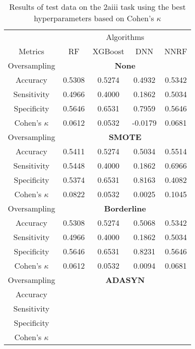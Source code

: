 \begin{table}[!htb]
\centering
\caption{Results of test data on the 2aiii task using the best hyperparameters based on Cohen's $\kappa$}
\label{tab:2aiii_test_results}
\begin{tabular}{c | c c c c}
\hline
 & \multicolumn{4}{c}{Algorithms}\\ 
Metrics &RF & XGBoost & DNN & NNRF\\ 
\hline
Oversampling &\multicolumn{4}{|c}{\textbf{None}}\\ 
\hline
Accuracy & 0.5308 & 0.5274 & 0.4932 & 0.5342\\ 
Sensitivity & 0.4966 & 0.4000 & 0.1862 & 0.5034\\ 
Specificity & 0.5646 & 0.6531 & 0.7959 & 0.5646\\ 
Cohen's $\kappa$ & 0.0612 & 0.0532 & -0.0179 & 0.0681\\ 
\hline
Oversampling &\multicolumn{4}{|c}{\textbf{SMOTE}}\\ 
\hline
Accuracy & 0.5411 & 0.5274 & 0.5034 & 0.5514\\ 
Sensitivity & 0.5448 & 0.4000 & 0.1862 & 0.6966\\ 
Specificity & 0.5374 & 0.6531 & 0.8163 & 0.4082\\ 
Cohen's $\kappa$ & 0.0822 & 0.0532 & 0.0025 & 0.1045\\ 
\hline
Oversampling &\multicolumn{4}{|c}{\textbf{Borderline}}\\ 
\hline
Accuracy & 0.5308 & 0.5274 & 0.5068 & 0.5342\\ 
Sensitivity & 0.4966 & 0.4000 & 0.1862 & 0.5034\\ 
Specificity & 0.5646 & 0.6531 & 0.8231 & 0.5646\\ 
Cohen's $\kappa$ & 0.0612 & 0.0532 & 0.0094 & 0.0681\\ 
\hline
Oversampling &\multicolumn{4}{|c}{\textbf{ADASYN}}\\ 
\hline
Accuracy &  &  &  & \\ 
Sensitivity &  &  &  & \\ 
Specificity &  &  &  & \\ 
Cohen's $\kappa$ &  &  &  & \\ 
\hline
\end{tabular}
\end{table}


